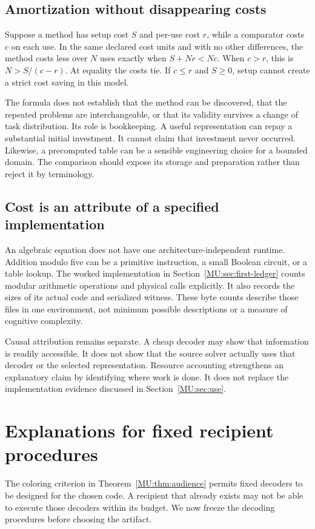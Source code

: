 \subsection{Amortization without disappearing costs}
Suppose a method has setup cost $S$ and per-use cost $r$, while a comparator costs $c$ on each use. In the same declared cost units and with no other differences, the method costs less over $N$ uses exactly when $S+Nr<Nc$. When $c>r$, this is $N>S/(c-r)$. At equality the costs tie. If $c\leq r$ and $S\geq0$, setup cannot create a strict cost saving in this model.

The formula does not establish that the method can be discovered, that the repeated problems are interchangeable, or that its validity survives a change of task distribution. Its role is bookkeeping. A useful representation can repay a substantial initial investment. It cannot claim that investment never occurred. Likewise, a precomputed table can be a sensible engineering choice for a bounded domain. The comparison should expose its storage and preparation rather than reject it by terminology.

\subsection{Cost is an attribute of a specified implementation}
An algebraic equation does not have one architecture-independent runtime. Addition modulo five can be a primitive instruction, a small Boolean circuit, or a table lookup. The worked implementation in Section~\ref{MU:sec:first-ledger} counts modular arithmetic operations and physical calls explicitly. It also records the sizes of its actual code and serialized witness. These byte counts describe those files in one environment, not minimum possible descriptions or a measure of cognitive complexity.

Causal attribution remains separate. A cheap decoder may show that information is readily accessible. It does not show that the source solver actually uses that decoder or the selected representation. Resource accounting strengthens an explanatory claim by identifying where work is done. It does not replace the implementation evidence discussed in Section~\ref{MU:sec:use}.

\section{Explanations for fixed recipient procedures}\label{MU:sec:fixed-decoders}
The coloring criterion in Theorem~\ref{MU:thm:audience} permits fixed decoders to be designed for the chosen code. A recipient that already exists may not be able to execute those decoders within its budget. We now freeze the decoding procedures before choosing the artifact.

